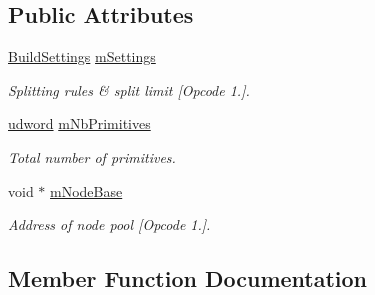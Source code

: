 \subsection*{Public Attributes}
\begin{DoxyCompactItemize}
\item 
\hyperlink{structOpcode_1_1BuildSettings}{Build\+Settings} \hyperlink{classOpcode_1_1AABBTreeBuilder_af611caf2ec3e36607f7f1c89b5b90ce3}{m\+Settings}\hypertarget{classOpcode_1_1AABBTreeBuilder_af611caf2ec3e36607f7f1c89b5b90ce3}{}\label{classOpcode_1_1AABBTreeBuilder_af611caf2ec3e36607f7f1c89b5b90ce3}

\begin{DoxyCompactList}\small\item\em Splitting rules \& split limit \mbox{[}Opcode 1.\mbox{]}. \end{DoxyCompactList}\item 
\hyperlink{IceTypes_8h_a44c6f1920ba5551225fb534f9d1a1733}{udword} \hyperlink{classOpcode_1_1AABBTreeBuilder_af5f999f273efaa5d6fb8270bddd20af9}{m\+Nb\+Primitives}\hypertarget{classOpcode_1_1AABBTreeBuilder_af5f999f273efaa5d6fb8270bddd20af9}{}\label{classOpcode_1_1AABBTreeBuilder_af5f999f273efaa5d6fb8270bddd20af9}

\begin{DoxyCompactList}\small\item\em Total number of primitives. \end{DoxyCompactList}\item 
void $\ast$ \hyperlink{classOpcode_1_1AABBTreeBuilder_afa4b0704c6e57deb8e9aa2e1dbf5a3ae}{m\+Node\+Base}\hypertarget{classOpcode_1_1AABBTreeBuilder_afa4b0704c6e57deb8e9aa2e1dbf5a3ae}{}\label{classOpcode_1_1AABBTreeBuilder_afa4b0704c6e57deb8e9aa2e1dbf5a3ae}

\begin{DoxyCompactList}\small\item\em Address of node pool \mbox{[}Opcode 1.\mbox{]}. \end{DoxyCompactList}\end{DoxyCompactItemize}


\subsection{Member Function Documentation}
